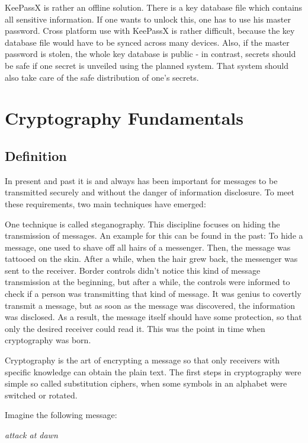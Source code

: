 KeePassX is rather an offline solution. There is a key database file
which contains all sensitive information. If one wants to unlock this,
one has to use his master password. Cross platform use with KeePassX is rather
difficult, because the key database file would have to be synced
across many devices. Also, if the master password is stolen, the whole
key database is public - in contrast, secrets should be safe if
one secret is unveiled using the planned system. That system should also
take care of the safe distribution of one's secrets.

\chapter{Cryptography Fundamentals}

\section{Definition}

In present and past it is and always has been important for messages to be
transmitted securely and without the danger of information disclosure. To meet
these requirements, two main techniques have emerged:

One technique is called steganography. This discipline focuses on hiding the
transmission of messages. An example for this can be found in the past: To hide
a message, one used to shave off all hairs of a messenger. Then, the message
was tattooed on the skin. After a while, when the hair grew back, the messenger
was sent to the receiver. Border controls didn't notice this kind of message
transmission at the beginning, but after a while, the controls were informed to
check if a person was transmitting that kind of message. It was genius to
covertly transmit a message, but as soon as the message was discovered, the
information was disclosed. As a result, the message itself should have some
protection, so that only the desired receiver could read it. This was the point
in time when cryptography was born.

Cryptography is the art of encrypting a message so that only receivers with
specific knowledge can obtain the plain text. The first steps in cryptography
were simple so called substitution ciphers, when some symbols in an alphabet
were switched or rotated.

Imagine the following message:

\vspace{0.5cm}
\textit{attack at dawn}
\vspace{0.5cm}

